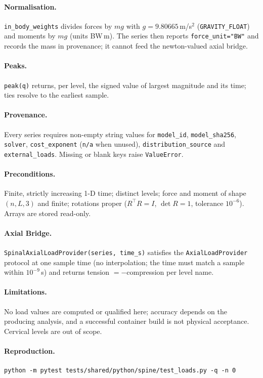 \paragraph{Normalisation.}
\texttt{in\_body\_weights} divides forces by $mg$ with $g=9.80665$\,m/s$^2$
(\texttt{GRAVITY\_FLOAT}) and moments by $mg$ (units BW\,m). The series then
reports \texttt{force\_unit="BW"} and records the mass in provenance; it cannot
feed the newton-valued axial bridge.

\paragraph{Peaks.}
\texttt{peak(q)} returns, per level, the signed value of largest magnitude and
its time; ties resolve to the earliest sample.

\paragraph{Provenance.}
Every series requires non-empty string values for \texttt{model\_id},
\texttt{model\_sha256}, \texttt{solver}, \texttt{cost\_exponent} (\texttt{n/a}
when unused), \texttt{distribution\_source} and \texttt{external\_loads}.
Missing or blank keys raise \texttt{ValueError}.

\paragraph{Preconditions.}
Finite, strictly increasing 1-D time; distinct levels; force and moment of
shape $(n,L,3)$ and finite; rotations proper ($R^\top R=I$, $\det R=1$,
tolerance $10^{-6}$). Arrays are stored read-only.

\paragraph{Axial Bridge.}
\texttt{SpinalAxialLoadProvider(series, time\_s)} satisfies the
\texttt{AxialLoadProvider} protocol at one sample time (no interpolation; the
time must match a sample within $10^{-9}$\,s) and returns tension $=-$compression
per level name.

\paragraph{Limitations.}
No load values are computed or qualified here; accuracy depends on the
producing analysis, and a successful container build is not physical
acceptance. Cervical levels are out of scope.

\paragraph{Reproduction.}
\begin{verbatim}
python -m pytest tests/shared/python/spine/test_loads.py -q -n 0
\end{verbatim}
